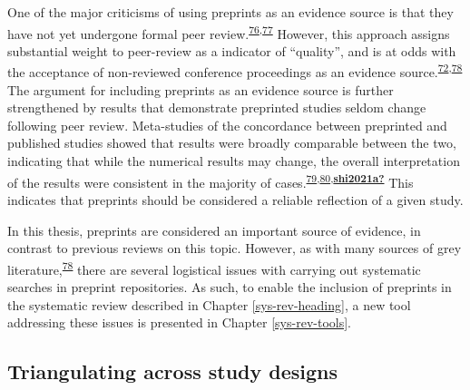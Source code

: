 \documentclass[a4paper, twoside]{templates/ociamthesis}
\begin{document}
One of the major criticisms of using preprints as an evidence source is that they have not yet undergone formal peer review.\textsuperscript{\protect\hyperlink{ref-maslove2018}{76},\protect\hyperlink{ref-schalkwyk2020}{77}} However, this approach assigns substantial weight to peer-review as a indicator of ``quality'', and is at odds with the acceptance of non-reviewed conference proceedings as an evidence source.\textsuperscript{\protect\hyperlink{ref-lefebvre2019searching}{72},\protect\hyperlink{ref-mahood2014}{78}} The argument for including preprints as an evidence source is further strengthened by results that demonstrate preprinted studies seldom change following peer review. Meta-studies of the concordance between preprinted and published studies showed that results were broadly comparable between the two, indicating that while the numerical results may change, the overall interpretation of the results were consistent in the majority of cases.\textsuperscript{\protect\hyperlink{ref-klein2019}{79},\protect\hyperlink{ref-nicholson2021}{80},\protect\hyperlink{ref-shi2021a}{\textbf{shi2021a?}}} This indicates that preprints should be considered a reliable reflection of a given study.

In this thesis, preprints are considered an important source of evidence, in contrast to previous reviews on this topic. However, as with many sources of grey literature,\textsuperscript{\protect\hyperlink{ref-mahood2014}{78}} there are several logistical issues with carrying out systematic searches in preprint repositories. As such, to enable the inclusion of preprints in the systematic review described in Chapter \ref{sys-rev-heading}, a new tool addressing these issues is presented in Chapter \ref{sys-rev-tools}.

\hypertarget{intro-triangulation}{%
\subsection{Triangulating across study designs}\label{intro-triangulation}}
\end{document}
